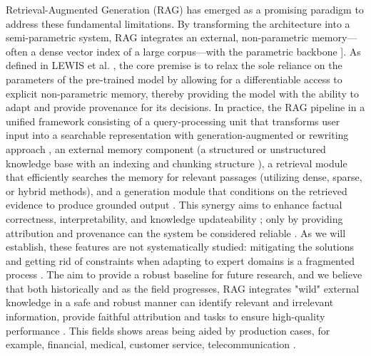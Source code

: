 \documentclass[11pt,a4paper]{article}
\begin{document}
Retrieval-Augmented Generation (RAG) has emerged as a promising paradigm to address these fundamental limitations. By transforming the architecture into a semi-parametric system, RAG integrates an external, non-parametric memory---often a dense vector index of a large corpus---with the parametric backbone \cite{arxiv:2005.11401v4,arxiv:1612.04426v1}]. As defined in LEWIS et al. \cite{arxiv:2005.11401v4}, the core premise is to relax the sole reliance on the parameters of the pre-trained model by allowing for a differentiable access to explicit non-parametric memory, thereby providing the model with the ability to adapt and provide provenance for its decisions. In practice, the RAG pipeline in a unified framework consisting of a query-processing unit that transforms user input into a searchable representation with generation-augmented or rewriting approach \cite{arxiv:2401.15884v2,arxiv:2409.01666v1,arxiv:2312.10997v5,arxiv:2009.08553v4}, an external memory component (a structured or unstructured knowledge base with an indexing and chunking structure \cite{arxiv:2402.05131v3}), a retrieval module that efficiently searches the memory for relevant passages (utilizing dense, sparse, or hybrid methods), and a generation module that conditions on the retrieved evidence to produce grounded output \cite{arxiv:2404.10981v1}. This synergy aims to enhance factual correctness, interpretability, and knowledge updateability \cite{arxiv:2403.03187v1}; only by providing attribution and provenance can the system be considered reliable \cite{arxiv:2305.14627v2}. As we will establish, these features are not systematically studied: mitigating the solutions and getting rid of constraints when adapting to expert domains is a fragmented process \cite{arxiv:2312.10997v5,arxiv:2312.10997v5}. The aim to provide a robust baseline for future research, and we believe that both historically and as the field progresses, RAG integrates "wild" external knowledge in a safe and robust manner can identify relevant and irrelevant information, provide faithful attribution and tasks to ensure high-quality performance \cite{arxiv:2212.10511v4,arxiv:2005.11401v4}. This fields shows areas being aided by production cases, for example, financial, medical, customer service, telecommunication \cite{arxiv:2402.13547v1,arxiv:2406.04369v1,arxiv:2404.17723v2}.
\end{document}
